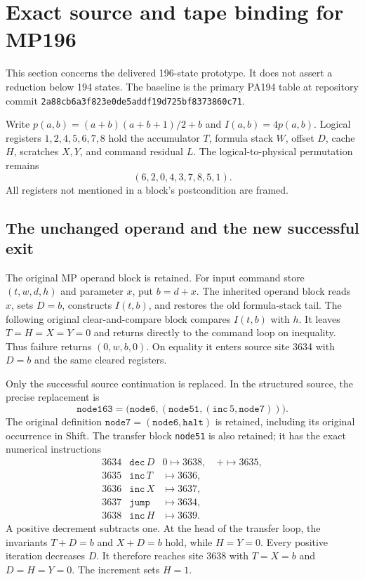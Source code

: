 \section{Exact source and tape binding for MP196}

This section concerns the delivered 196-state prototype. It does not
assert a reduction below 194 states. The baseline is the primary PA194
table at repository commit
\texttt{2a88cb6a3f823e0de5addf19d725bf8373860c71}.

Write $p(a,b)=(a+b)(a+b+1)/2+b$ and $I(a,b)=4p(a,b)$.
Logical registers $1,2,4,5,6,7,8$ hold the accumulator $T$, formula stack
$W$, offset $D$, cache $H$, scratches $X,Y$, and command residual $L$.
The logical-to-physical permutation remains
\[
 (6,2,0,4,3,7,8,5,1).
\]
All registers not mentioned in a block's postcondition are framed.

\subsection{The unchanged operand and the new successful exit}

The original MP operand block is retained. For input command store
$(t,w,d,h)$ and parameter $x$, put $b=d+x$. The inherited operand block
reads $x$, sets $D=b$, constructs $I(t,b)$, and restores the old
formula-stack tail. The following original clear-and-compare block
compares $I(t,b)$ with $h$. It leaves $T=H=X=Y=0$ and returns directly
to the command loop on inequality. Thus failure returns $(0,w,b,0)$.
On equality it enters source site 3634 with $D=b$ and the same cleared
registers.

Only the successful source continuation is replaced. In the structured
source, the precise replacement is
\[
 \mathtt{node163}
 =\bigl(\mathtt{node6},
     (\mathtt{node51},(\mathtt{inc}\,5,\mathtt{node7}))\bigr).
\]
The original definition
$\mathtt{node7}=(\mathtt{node6},\mathtt{halt})$ is retained, including
its original occurrence in Shift. The transfer block \texttt{node51}
is also retained; it has the exact numerical instructions
\[
\begin{array}{rll}
3634&\mathtt{dec}\,D&0\mapsto3638,\quad +\mapsto3635,\\
3635&\mathtt{inc}\,T&\mapsto3636,\\
3636&\mathtt{inc}\,X&\mapsto3637,\\
3637&\mathtt{jump}&\mapsto3634,\\
3638&\mathtt{inc}\,H&\mapsto3639.
\end{array}
\]
A positive decrement subtracts one. At the head of the transfer loop,
the invariants $T+D=b$ and $X+D=b$ hold, while $H=Y=0$.
Every positive iteration decreases $D$. It therefore reaches site 3638
with $T=X=b$ and $D=H=Y=0$. The increment sets $H=1$.

